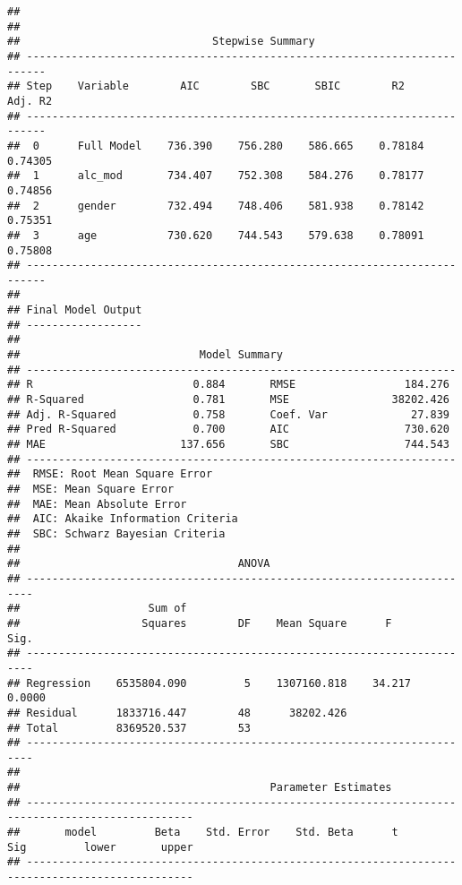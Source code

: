 \documentclass[
]{article}
\begin{document}
\begin{verbatim}
## 
## 
##                              Stepwise Summary                              
## -------------------------------------------------------------------------
## Step    Variable        AIC        SBC       SBIC        R2       Adj. R2 
## -------------------------------------------------------------------------
##  0      Full Model    736.390    756.280    586.665    0.78184    0.74305 
##  1      alc_mod       734.407    752.308    584.276    0.78177    0.74856 
##  2      gender        732.494    748.406    581.938    0.78142    0.75351 
##  3      age           730.620    744.543    579.638    0.78091    0.75808 
## -------------------------------------------------------------------------
## 
## Final Model Output 
## ------------------
## 
##                            Model Summary                            
## -------------------------------------------------------------------
## R                         0.884       RMSE                 184.276 
## R-Squared                 0.781       MSE                38202.426 
## Adj. R-Squared            0.758       Coef. Var             27.839 
## Pred R-Squared            0.700       AIC                  730.620 
## MAE                     137.656       SBC                  744.543 
## -------------------------------------------------------------------
##  RMSE: Root Mean Square Error 
##  MSE: Mean Square Error 
##  MAE: Mean Absolute Error 
##  AIC: Akaike Information Criteria 
##  SBC: Schwarz Bayesian Criteria 
## 
##                                  ANOVA                                  
## -----------------------------------------------------------------------
##                    Sum of                                              
##                   Squares        DF    Mean Square      F         Sig. 
## -----------------------------------------------------------------------
## Regression    6535804.090         5    1307160.818    34.217    0.0000 
## Residual      1833716.447        48      38202.426                     
## Total         8369520.537        53                                    
## -----------------------------------------------------------------------
## 
##                                       Parameter Estimates                                        
## ------------------------------------------------------------------------------------------------
##       model         Beta    Std. Error    Std. Beta      t        Sig         lower       upper 
## ------------------------------------------------------------------------------------------------

\end{verbatim}
\end{document}
